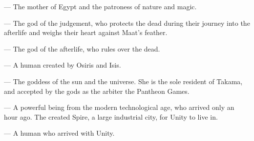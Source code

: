 \documentclass[blue]{guardians}
\begin{document}
\begin{itemz}
  \item \cIsis{} --- The mother of Egypt and the patroness of nature and magic.
  \item \cAnubis{} --- The god of the judgement, who protects the dead during their journey into the afterlife and weighs their heart against Maat's feather.
  \item \cOsiris{} --- The god of the afterlife, who rules over the dead.
  \item \cEgyptianHuman{} --- A human created by Osiris and Isis.
\end{itemz}

\begin{itemz}
  \item \cAmaterasu{} --- The goddess of the sun and the universe. She is the sole resident of Takama, and accepted by the gods as the arbiter the Pantheon Games.
\end{itemz}

\begin{itemz}
  \item\cUnity{} --- A powerful being from the modern technological age, who arrived only an hour ago. The \cCaretaker{} created Spire, a large industrial city, for Unity to live in.
  \item\cKachiko{} --- A human who arrived with Unity.
\end{itemz}
\end{document}
